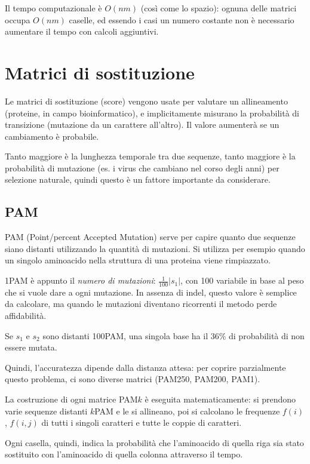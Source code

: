 Il tempo computazionale è $O(nm)$ (così come lo spazio): ognuna delle matrici occupa $O(nm)$ caselle, ed essendo i casi un numero costante non è necessario aumentare il tempo con calcoli aggiuntivi.

\newpage
\section{Matrici di sostituzione}
Le matrici di sostituzione (score) vengono usate per valutare un allineamento (proteine, in campo bioinformatico), e implicitamente misurano la probabilità di transizione (mutazione da un carattere all'altro). Il valore aumenterà se un cambiamento è probabile. 

Tanto maggiore è la lunghezza temporale tra due sequenze, tanto maggiore è la probabilità di mutazione (es. i virus che cambiano nel corso degli anni) per selezione naturale, quindi questo è un fattore importante da considerare.

\subsection{PAM}
PAM (Point/percent Accepted Mutation) serve per capire quanto due sequenze siano distanti utilizzando la quantità di mutazioni. Si utilizza per esempio quando un singolo aminoacido nella struttura di una proteina viene rimpiazzato.

1PAM è appunto il \textit{numero di mutazioni}: $\frac{1}{100}|s_1|$, con 100 variabile in base al peso che si vuole dare a ogni mutazione. In assenza di indel, questo valore è semplice da calcolare, ma quando le mutazioni diventano ricorrenti il metodo perde affidabilità.

\begin{example}{}{}
Se $s_1$ e $s_2$ sono distanti 100PAM, una singola base ha il 36\% di probabilità di non essere mutata.
\end{example}
Quindi, l'accuratezza dipende dalla distanza attesa: per coprire parzialmente questo problema, ci sono diverse matrici (PAM250, PAM200, PAM1).

La costruzione di ogni matrice PAM$k$ è eseguita matematicamente: si prendono varie sequenze distanti $k$PAM e le si allineano, poi si calcolano le frequenze $f(i)$, $f(i, j)$ di tutti i singoli caratteri e tutte le coppie di caratteri.

Ogni casella, quindi, indica la probabilità che l'aminoacido di quella riga sia stato sostituito con l'aminoacido di quella colonna attraverso il tempo.

